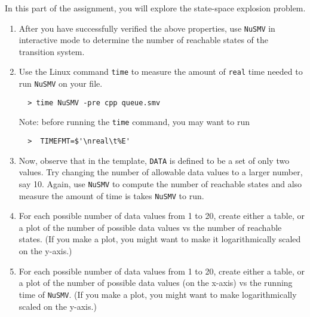 \documentclass[12pt]{article}
\newenvironment{problem}[2][Problem]{\begin{trivlist}
\item[\hskip \labelsep {\bfseries #1}\hskip \labelsep {\bfseries #2.}]}{\end{trivlist}}
\begin{document}
\begin{problem}{3. Scalability of verification.} In this part of the assignment, you will explore the state-space explosion problem. \\

\begin{enumerate}[label=\roman*.]

\item After you have successfully verified the above properties, use \texttt{NuSMV} in interactive mode to determine the number of reachable states of the transition system.

\item Use the Linux command \texttt{time} to measure the amount of \texttt{real} time needed to run \texttt{NuSMV} on your file.

\begin{verbatim}
  > time NuSMV -pre cpp queue.smv
\end{verbatim}

Note: before running the \texttt{time} command, you may want to run
\begin{verbatim}
  >  TIMEFMT=$'\nreal\t%E' 
\end{verbatim}

\item Now, observe that in the template, \texttt{DATA} is defined to be a set of only two values. Try changing the number of allowable data values to a larger number, say 10. Again, use
\texttt{NuSMV} to compute the number of reachable states and also measure the amount of time is takes \texttt{NuSMV} to run.

\item For each possible number of data values from 1 to 20, create either a table, or a plot of the number of possible data values vs the number of reachable states. (If you make a plot, you might want to make it logarithmically scaled on the y-axis.)

\item For each possible number of data values from 1 to 20, create either a table, or a plot of the number of possible data values (on the x-axis) vs the running time of \texttt{NuSMV}. (If you make a plot, you might want to make logarithmically scaled on the y-axis.)



\end{enumerate}

\end{problem}
\end{document}

